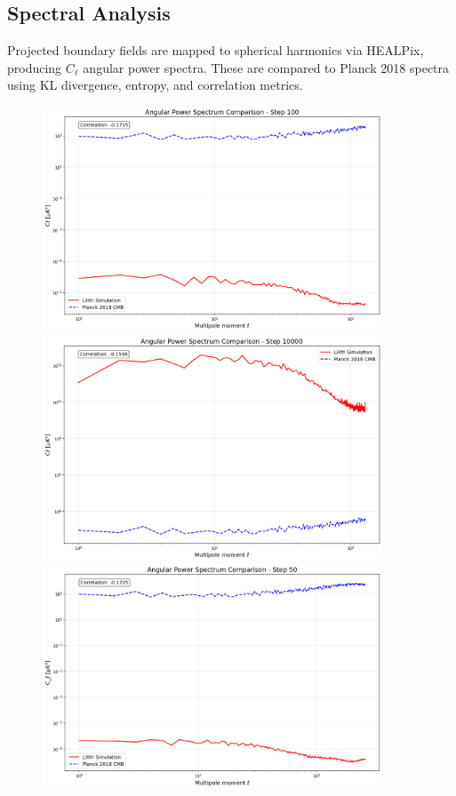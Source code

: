 \subsection{Spectral Analysis}
Projected boundary fields are mapped to spherical harmonics via HEALPix, producing $C_\ell$ angular power spectra. These are compared to Planck 2018 spectra using KL divergence, entropy, and correlation metrics.

\begin{figure}[ht]
  \centering
  \includegraphics[width=0.9\textwidth]{images/power_spectrum_000100.png}
  \includegraphics[width=0.9\textwidth]{images/power_spectrum_010000.png}
  \includegraphics[width=0.9\textwidth]{images/power_spectrum1_000050.png}

\end{figure}
